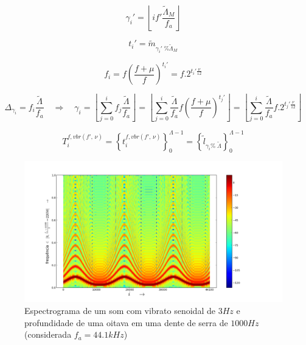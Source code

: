 \begin{equation}\label{vbrGamma}
\gamma_i'=\left \lfloor i f' \frac{\widetilde{\Lambda}_M}{f_a} \right \rfloor
\end{equation}

\begin{equation}\label{vbrAux}
t_i'=\widetilde{m}_{\gamma_i' \;\% \widetilde{\Lambda}_M}
\end{equation}

\begin{equation}\label{vbrF}
f_i=f \left ( \frac{f + \mu }{f} \right )^{t_i'}=f . 2^{t_i'\frac{\nu}{12}}
\end{equation}

\begin{equation}\label{vbrGamma2}
\Delta_{\gamma_i}=f_i\frac{\widetilde{\Lambda}}{f_a} \quad \Rightarrow \quad \gamma_i = \left \lfloor \sum_{j=0}^{i} f_j \frac{\widetilde{\Lambda}}{f_a} \right \rfloor = \left \lfloor \sum_{j=0}^{i} \frac{\widetilde{\Lambda}}{f_a}f \left ( \frac{f + \mu }{f} \right )^{t_j'}  \right \rfloor= \left \lfloor \sum_{j=0}^{i} \frac{\widetilde{\Lambda}}{f_a}f . 2^{t_j'\frac{\nu}{12}}  \right \rfloor
\end{equation}

\begin{equation}\label{vbrT}
T_i^{f, vbr(f',\,\nu)}=\left\{ t_i^{f,vbr(f',\,\nu)} \right\}_0^{\Lambda-1}=\left\{ \widetilde{l}_{\gamma_i \%\; \widetilde{\Lambda} } \right\}_0^{\Lambda-1}
\end{equation}


\begin{figure}[h!]
    \centering
        \includegraphics[width=\textwidth]{figuras/vibrato___}
    \caption{Espectrograma de um som com vibrato senoidal de $3Hz$ e profundidade de uma oitava em uma dente de serra de $1000Hz$ (considerada $f_a=44.1kHz$)}
        \label{fig:vibrato}
\end{figure}

